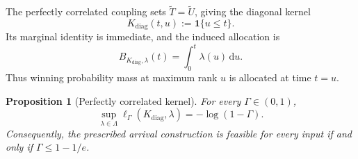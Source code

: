 \documentclass[11pt]{article}
\newtheorem{proposition}[theorem]{Proposition}
\theoremstyle{definition}
\theoremstyle{remark}
\newcommand{\dd}{\,\mathrm d}
\newcommand{\ind}{\mathbf 1}
\begin{document}
The perfectly correlated coupling sets $\widetilde T=\widetilde U$, giving the diagonal kernel
\begin{equation}\label{eq:diagonal-kernel}
 K_{\mathrm{diag}}(t,u):=\ind\{u\le t\}.
\end{equation}
Its marginal identity is immediate, and the induced allocation is
\begin{equation}\label{eq:diagonal-allocation}
 B_{K_{\mathrm{diag}},\lambda}(t)=\int_0^t\lambda(u)\dd u.
\end{equation}
Thus winning probability mass at maximum rank $u$ is allocated at time $t=u$.

\begin{proposition}[Perfectly correlated kernel]\label{prop:diagonal}
For every $\Gamma\in(0,1)$,
\begin{equation}\label{eq:diagonal-worst-load}
 \sup_{\lambda\in\Lambda}\ell_\Gamma(K_{\mathrm{diag}},\lambda)
 =-\log(1-\Gamma).
\end{equation}
Consequently, the prescribed arrival construction is feasible for every input if and only if $\Gamma\le1-1/e$.
\end{proposition}
\end{document}
